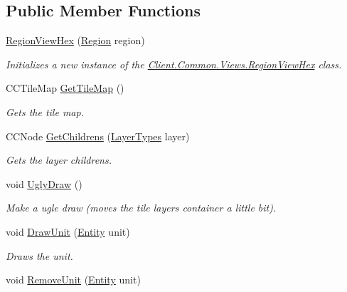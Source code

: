 \subsection*{Public Member Functions}
\begin{DoxyCompactItemize}
\item 
\hyperlink{classClient_1_1Common_1_1Views_1_1RegionViewHex_abbf078b70a18904bb0d213ebabc4fbe9}{Region\+View\+Hex} (\hyperlink{classCore_1_1Models_1_1Region}{Region} region)
\begin{DoxyCompactList}\small\item\em Initializes a new instance of the \hyperlink{classClient_1_1Common_1_1Views_1_1RegionViewHex}{Client.\+Common.\+Views.\+Region\+View\+Hex} class. \end{DoxyCompactList}\item 
C\+C\+Tile\+Map \hyperlink{classClient_1_1Common_1_1Views_1_1RegionViewHex_a04baa3e55b66614d63689d3721aea018}{Get\+Tile\+Map} ()
\begin{DoxyCompactList}\small\item\em Gets the tile map. \end{DoxyCompactList}\item 
C\+C\+Node \hyperlink{classClient_1_1Common_1_1Views_1_1RegionViewHex_a6d1d7f8cf5b23e28f621bdff01f6eb19}{Get\+Childrens} (\hyperlink{classClient_1_1Common_1_1Views_1_1RegionViewHex_a12e481b76f5d2aae6defc25692a677f7}{Layer\+Types} layer)
\begin{DoxyCompactList}\small\item\em Gets the layer childrens. \end{DoxyCompactList}\item 
void \hyperlink{classClient_1_1Common_1_1Views_1_1RegionViewHex_ac8c96638d54095efa54763eb7183df2f}{Ugly\+Draw} ()
\begin{DoxyCompactList}\small\item\em Make a ugle draw (moves the tile layers container a little bit). \end{DoxyCompactList}\item 
void \hyperlink{classClient_1_1Common_1_1Views_1_1RegionViewHex_a16373731b9503b152d271246656c39cf}{Draw\+Unit} (\hyperlink{classCore_1_1Models_1_1Entity}{Entity} unit)
\begin{DoxyCompactList}\small\item\em Draws the unit. \end{DoxyCompactList}\item 
void \hyperlink{classClient_1_1Common_1_1Views_1_1RegionViewHex_aa03b7fb635e4b7193d13bac5900c1324}{Remove\+Unit} (\hyperlink{classCore_1_1Models_1_1Entity}{Entity} unit)

\end{DoxyCompactItemize}
